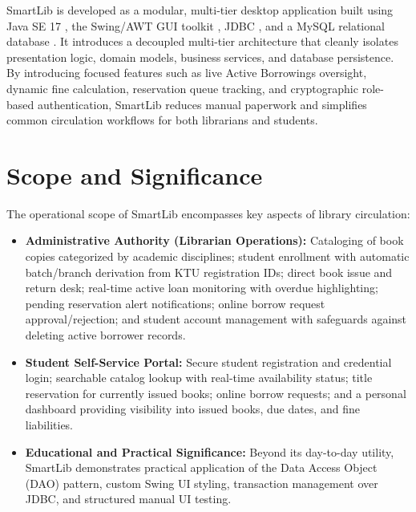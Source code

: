 SmartLib is developed as a modular, multi-tier desktop application built using Java SE 17 \cite{oracle2021javase}, the Swing/AWT GUI toolkit \cite{oracle2021swing}, JDBC \cite{oracle2021jdbc}, and a MySQL relational database \cite{mysql2023manual}. It introduces a decoupled multi-tier architecture that cleanly isolates presentation logic, domain models, business services, and database persistence. By introducing focused features such as live Active Borrowings oversight, dynamic fine calculation, reservation queue tracking, and cryptographic role-based authentication, SmartLib reduces manual paperwork and simplifies common circulation workflows for both librarians and students.

\section{Scope and Significance}
The operational scope of SmartLib encompasses key aspects of library circulation:
\begin{itemize}
    \item \textbf{Administrative Authority (Librarian Operations):} Cataloging of book copies categorized by academic disciplines; student enrollment with automatic batch/branch derivation from KTU registration IDs; direct book issue and return desk; real-time active loan monitoring with overdue highlighting; pending reservation alert notifications; online borrow request approval/rejection; and student account management with safeguards against deleting active borrower records.
    \item \textbf{Student Self-Service Portal:} Secure student registration and credential login; searchable catalog lookup with real-time availability status; title reservation for currently issued books; online borrow requests; and a personal dashboard providing visibility into issued books, due dates, and fine liabilities.
    \item \textbf{Educational and Practical Significance:} Beyond its day-to-day utility, SmartLib demonstrates practical application of the Data Access Object (DAO) pattern, custom Swing UI styling, transaction management over JDBC, and structured manual UI testing.
\end{itemize}
